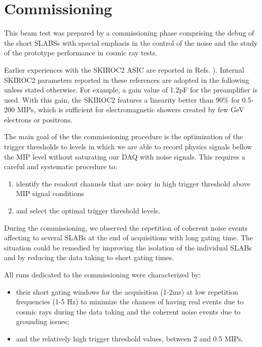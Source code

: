 \documentclass[a4paper,11pt]{article}
\begin{document}
\section{Commissioning}
\label{sec:commissioning}

This beam test was prepared by a commissioning phase comprising
the debug of the
short SLABSs with special emphasis in the control of the noise and the study of the
prototype performance in cosmic ray tests.

Earlier experiences with the SKIROC2 ASIC are reported in
Refs. \cite{Amjad:2014tha,Suehara:2018mqk}). 
Internal SKIROC2 parameters reported in these references are adopted in the following
unless stated otherwise.
For example, a gain value of 1.2pF for the preamplifier is used. 
With this gain, the SKIROC2 features a linearity better than 90\% 
for 0.5-200 MIPs, which is sufficient for 
electromagnetic showers created by few GeV 
electrons or positrons.

The main goal of the the commissioning  procedure is 
the optimization of the trigger thresholds to levels in which we are able
to record physics signals bellow the MIP level without saturating our DAQ with
noise signals. This requires a careful and systematic procedure to:

\begin{enumerate}
  \item identify the readout channels that are noisy in high trigger threshold above MIP signal conditions
  \item and select the optimal trigger threshold levels.
\end{enumerate}

During the commissioning, we observed the repetition of coherent noise events affecting to several
SLABs at the end of acquisitions with long gating time. The situation
could be remedied by improving the isolation of the individual SLABs and by reducing the
data taking to short gating times.

All runs dedicated to the commissioning were characterized by:
\begin{itemize}
  \item their short gating windows for the acquisition (1-2ms)
   at low repetition frequencies (1-5 Hz) to minimize the chances of having real events due to cosmic rays during the data taking and the coherent noise events due to grounding issues;
 \item and the relatively high trigger threshold values, between 2 and 0.5 MIPs.
\end{itemize}
\end{document}
